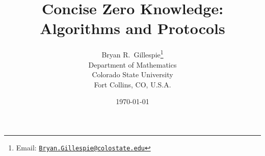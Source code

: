 \documentclass[12pt]{article}
\theoremstyle{plain}
\theoremstyle{definition}
\begin{document}
\title{Concise Zero Knowledge: \\ Algorithms and Protocols}

\author{Bryan R.\ Gillespie\footnote{Email: \href{mailto:Bryan.Gillespie@colostate.edu}{\texttt{Bryan.Gillespie@colostate.edu}}}\\[1ex] Department of Mathematics\\ Colorado State University\\ Fort Collins, CO, U.S.A.}

\date{\today}

\maketitle
\end{document}
